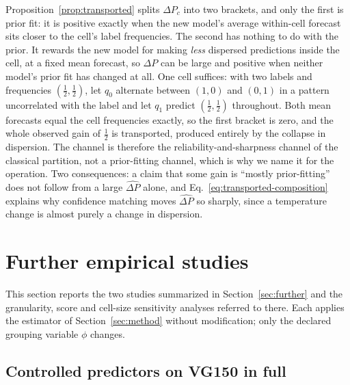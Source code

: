 Proposition~\ref{prop:transported} splits $\Delta P_c$ into two brackets, and only the
first is prior fit: it is positive exactly when the new model's average
within-cell forecast sits closer to the cell's label frequencies. The second has nothing to
do with the prior. It rewards the new model for making \emph{less} dispersed predictions
inside the cell, at a fixed mean forecast, so $\Delta P$ can be large and positive when
neither model's prior fit has changed at all. One cell suffices: with two labels and
frequencies $(\tfrac12,\tfrac12)$, let $q_0$ alternate between $(1,0)$ and $(0,1)$ in a
pattern uncorrelated with the label and let $q_1$ predict $(\tfrac12,\tfrac12)$ throughout.
Both mean forecasts equal the cell frequencies exactly, so the first bracket is zero, and the
whole observed gain of $\tfrac12$ is transported, produced entirely by the collapse in
dispersion. The channel is therefore the reliability-and-sharpness channel of the classical
partition, not a prior-fitting channel, which is why we name it for the operation. Two
consequences: a claim that some gain is ``mostly prior-fitting'' does not follow from a large
$\widehat{\Delta P}$ alone, and Eq.~\eqref{eq:transported-composition} explains why
confidence matching moves $\widehat{\Delta P}$ so sharply, since a temperature change is
almost purely a change in dispersion.


\section{Further empirical studies}\label{app:studies}

This section reports the two studies summarized in Section~\ref{sec:further} and the
granularity, score and cell-size sensitivity analyses referred to there. Each applies the
estimator of Section~\ref{sec:method} without modification; only the declared grouping
variable $\phi$ changes.

\subsection{Controlled predictors on VG150 in full}\label{app:vgmain-full}

